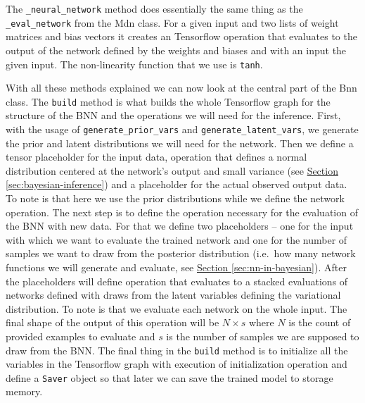 \documentclass[12pt,a4paper,twoside]{scrartcl}
\numberwithin{equation}{section}
\newcommand{\refsec}[1]{\hyperref[#1]{Section \ref*{#1}}}
\begin{document}
The \texttt{\_neural\_network} method does essentially the same thing as the \texttt{\_eval\_network} from the Mdn class. For a given input and two lists of weight matrices and bias vectors it creates an Tensorflow operation that evaluates to the output of the network defined by the weights and biases and with an input the given input. The non-linearity function that we use is \texttt{tanh}. 

With all these methods explained we can now look at the central part of the Bnn class. The \texttt{build} method is what builds the whole Tensorflow graph for the structure of the BNN and the operations we will need for the inference. First, with the usage of \texttt{generate\_prior\_vars} and \texttt{generate\_latent\_vars}, we generate the prior and latent distributions we will need for the network. Then we define a tensor placeholder for the input data, operation that defines a normal distribution centered at the network's output and small variance (see \refsec{sec:bayesian-inference}) and a placeholder for the actual observed output data. To note is that here we use the prior distributions while we define the network operation. The next step is to define the operation necessary for the evaluation of the BNN with new data. For that we define two placeholders -- one for the input with which we want to evaluate the trained network and one for the number of samples we want to draw from the posterior distribution (i.e.\ how many network functions we will generate and evaluate, see \refsec{sec:nn-in-bayesian}). After the placeholders will define operation that evaluates to a stacked evaluations of networks defined with draws from the latent variables defining the variational distribution. To note is that we evaluate each network on the whole input. The final shape of the output of this operation will be \(N \times s\) where \(N\) is the count of provided examples to evaluate and \(s\) is the number of samples we are supposed to draw from the BNN. The final thing in the \texttt{build} method is to initialize all the variables in the Tensorflow graph with execution of initialization operation and define a \texttt{Saver} object so that later we can save the trained model to storage memory.
\end{document}
